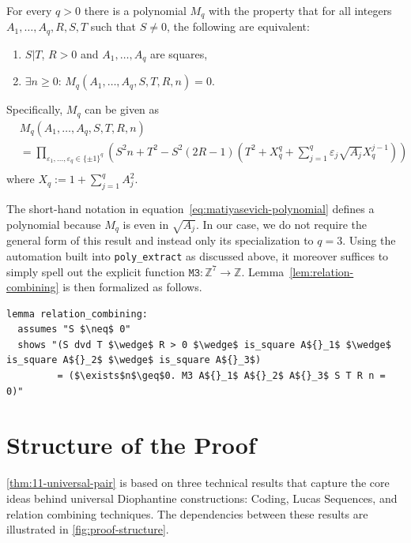 \documentclass[a4paper,USenglish,cleveref,autoref,thm-restate]{lipics-v2021}
\newcommand{\Z}{{\mathbb Z}}
\begin{document}
\begin{lemma}\label{lem:relation-combining}
    For every $q>0$ there is a polynomial $M_q$ with the property that for all integers $A_1,\dots,A_q,R,S,T$ such that $S\neq 0$, the following are equivalent:
    \begin{enumerate}
        \item $S|T$, $R>0$ and $A_1,\dots,A_q$ are squares,
        \item $\exists n \ge 0 : \, M_q(A_1,\dots,A_q,S,T,R,n)=0$.
    \end{enumerate}
    Specifically, $M_q$ can be given as	
    \begin{equation} \label{eq:matiyasevich-polynomial} \begin{split}
        &M_q(A_1,\dots,A_q,S,T,R,n)\\
        &=\prod_{\varepsilon_1,\dots,\varepsilon_q\in\{\pm1\}^q}\left(S^2n + T^2 - S^2(2R-1)\left(T^2 + X_q^q +\sum_{j=1}^q \varepsilon_j \sqrt{A_j}X_q^{j-1}\right) \right) \\
    \end{split} \end{equation}
    where $X_q:=1+\sum_{j=1}^{q}A_j^2$.
\end{lemma}

The short-hand notation in equation~\eqref{eq:matiyasevich-polynomial} defines a polynomial because $M_q$ is even in $\sqrt{A_j}$. In our case, we do not require the general form of this result and instead only its specialization to $q = 3$. Using the automation built into \texttt{poly\_extract} as discussed above, it moreover suffices to simply spell out the explicit function $\texttt{M3} : \Z^7 \rightarrow \Z$. Lemma~\ref{lem:relation-combining} is then formalized as follows.

\begin{lstlisting}
lemma relation_combining:
  assumes "S $\neq$ 0"
  shows "(S dvd T $\wedge$ R > 0 $\wedge$ is_square A${}_1$ $\wedge$ is_square A${}_2$ $\wedge$ is_square A${}_3$)
         = ($\exists$n$\geq$0. M3 A${}_1$ A${}_2$ A${}_3$ S T R n = 0)"
\end{lstlisting}

\section{Structure of the Proof}
\cref{thm:11-universal-pair} is based on three technical results that capture the core ideas behind universal Diophantine constructions: Coding, Lucas Sequences, and relation combining techniques. The dependencies between these results are illustrated in \cref{fig:proof-structure}.
\end{document}
